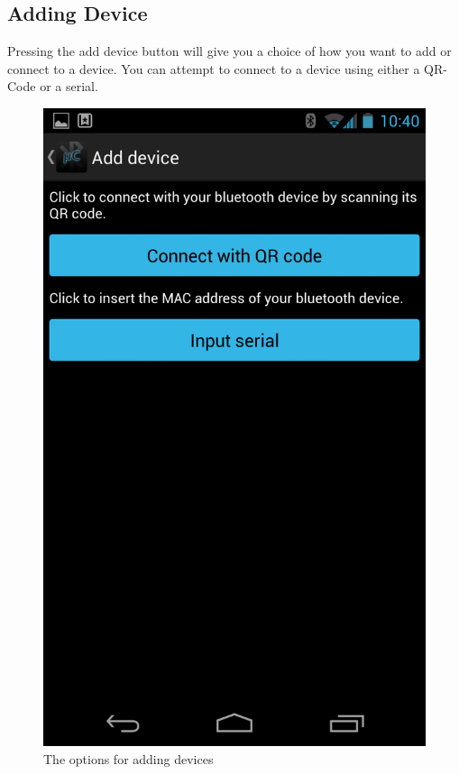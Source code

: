 \subsection{Adding Device}
Pressing the add device button will give you a choice of how you want to add or connect to a device. You can attempt to connect to a device using either a QR-Code or a serial.
\newline
\begin{figure}[H]
	\centering
	\includegraphics[scale = 0.3]{images/Screenshots/add_device.png}
	\caption{The options for adding devices}
\end{figure}

